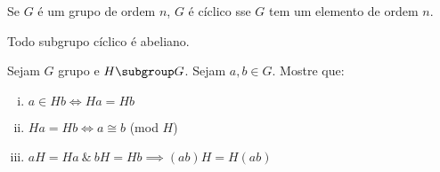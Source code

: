 \begin{exercise}
Se $G$ é um grupo de ordem $n$, $G$ é cíclico sse $G$ tem um elemento de ordem $n$.
\end{exercise}

\begin{exercise}
Todo subgrupo cíclico é abeliano.
\end{exercise}

\begin{exercise}
Sejam $G$ grupo e $H \subgroup G$. Sejam $a,b \in G$. Mostre que:
    \begin{enumerate}[(i)]
        \item $a \in Hb \iff Ha = Hb$
        \item $Ha = Hb \iff a \cong b$ (mod $H$)
        \item $aH = Ha \ \&\ bH = Hb \implies (ab)H = H(ab)$
    \end{enumerate}
\end{exercise}
